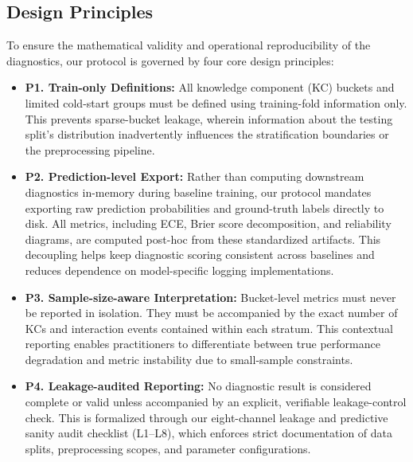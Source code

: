 \subsection{Design Principles}
\label{sec:principles}
To ensure the mathematical validity and operational reproducibility of the diagnostics, our protocol is governed by four core design principles:
\begin{itemize}
    \item \textbf{P1. Train-only Definitions:} All knowledge component (KC) buckets and limited cold-start groups must be defined using training-fold information only. This prevents sparse-bucket leakage, wherein information about the testing split's distribution inadvertently influences the stratification boundaries or the preprocessing pipeline.
    \item \textbf{P2. Prediction-level Export:} Rather than computing downstream diagnostics in-memory during baseline training, our protocol mandates exporting raw prediction probabilities and ground-truth labels directly to disk. All metrics, including ECE, Brier score decomposition, and reliability diagrams, are computed post-hoc from these standardized artifacts. This decoupling helps keep diagnostic scoring consistent across baselines and reduces dependence on model-specific logging implementations.
    \item \textbf{P3. Sample-size-aware Interpretation:} Bucket-level metrics must never be reported in isolation. They must be accompanied by the exact number of KCs and interaction events contained within each stratum. This contextual reporting enables practitioners to differentiate between true performance degradation and metric instability due to small-sample constraints.
    \item \textbf{P4. Leakage-audited Reporting:} No diagnostic result is considered complete or valid unless accompanied by an explicit, verifiable leakage-control check. This is formalized through our eight-channel leakage and predictive sanity audit checklist (L1--L8), which enforces strict documentation of data splits, preprocessing scopes, and parameter configurations.
\end{itemize}

